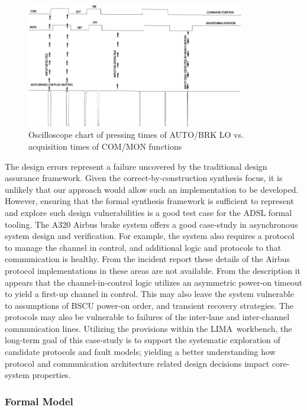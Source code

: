 \begin{figure}
\begin{center}
\includegraphics[width=0.85\textwidth]{figures/newtrace.jpg}
\caption{Oscilloscope chart of pressing times of AUTO/BRK LO vs. acquisition times of COM/MON functions}
\label{fig:push_button_sampling}
\end{center}
\end{figure}

 The design errors represent a failure uncovered by the traditional design assurance
 framework.  Given the correct-by-construction synthesis focus, it is unlikely
 that our approach would allow such an implementation to be developed.  However,
 ensuring that the formal synthesis framework is sufficient to represent and
 explore such design vulnerabilities is a good test case for the ADSL formal
 tooling.  The A320 Airbus brake system offers a good case-study in asynchronous system design and verification. For example, the system also
 requires a protocol to manage the channel in control, and additional logic and
 protocols to that communication is healthy.  From the incident report these
 details of the Airbus protocol implementations in these areas are not
 available. From the description it appears that the channel-in-control logic
 utilizes an asymmetric power-on timeout to yield a first-up channel in
 control. This may also leave the system vulnerable to assumptions of BSCU
 power-on order, and transient recovery strategies.  The protocols may also be
 vulnerable to failures of the inter-lane and inter-channel communication lines.
  Utilizing the provisions within the LIMA\ workbench, the long-term goal
of this case-study is to support the systematic exploration of candidate
protocols and fault models; yielding a better understanding how protocol
and communication architecture related design decisions impact core-system
properties.
  \subsubsection{Formal Model}


